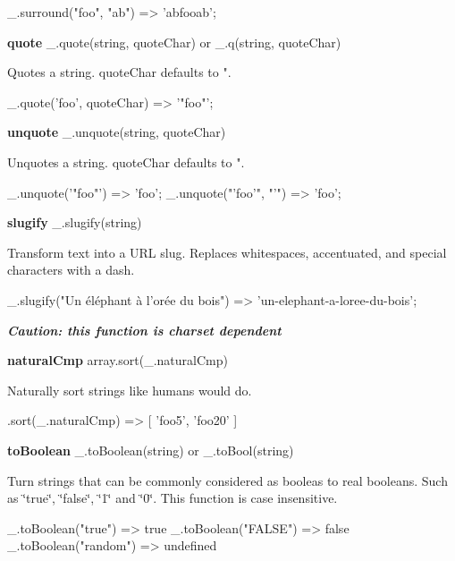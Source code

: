 \begin{DoxyCode}
\_.surround("foo", "ab")
=> 'abfooab';
\end{DoxyCode}


{\bfseries quote} \+\_\+.\+quote(string, quote\+Char) or \+\_\+.\+q(string, quote\+Char)

Quotes a string. {\ttfamily quote\+Char} defaults to {\ttfamily "}.


\begin{DoxyCode}
\_.quote('foo', quoteChar)
=> '"foo"';
\end{DoxyCode}
 {\bfseries unquote} \+\_\+.\+unquote(string, quote\+Char)

Unquotes a string. {\ttfamily quote\+Char} defaults to {\ttfamily "}.


\begin{DoxyCode}
\_.unquote('"foo"')
=> 'foo';
\_.unquote("'foo'", "'")
=> 'foo';
\end{DoxyCode}


{\bfseries slugify} \+\_\+.\+slugify(string)

Transform text into a U\+RL slug. Replaces whitespaces, accentuated, and special characters with a dash.


\begin{DoxyCode}
\_.slugify("Un éléphant à l'orée du bois")
=> 'un-elephant-a-loree-du-bois';
\end{DoxyCode}


{\itshape {\bfseries Caution\+: this function is charset dependent}}

{\bfseries natural\+Cmp} array.\+sort(\+\_\+.\+natural\+Cmp)

Naturally sort strings like humans would do.


\begin{DoxyCode}
.sort(\_.naturalCmp)
=> [ 'foo5', 'foo20' ]
\end{DoxyCode}


{\bfseries to\+Boolean} \+\_\+.\+to\+Boolean(string) or \+\_\+.\+to\+Bool(string)

Turn strings that can be commonly considered as booleas to real booleans. Such as \char`\"{}true\char`\"{}, \char`\"{}false\char`\"{}, \char`\"{}1\char`\"{} and \char`\"{}0\char`\"{}. This function is case insensitive.


\begin{DoxyCode}
\_.toBoolean("true")
=> true
\_.toBoolean("FALSE")
=> false
\_.toBoolean("random")
=> undefined
\end{DoxyCode}



